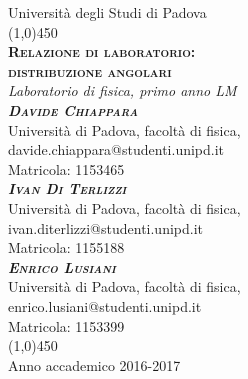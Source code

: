 
\begin{titlepage}

\begin{center}
\LARGE{Università degli Studi di Padova}\\
\line(1,0){450}\\
\vspace{1em}
\Huge{\textsc{\textbf{Relazione di laboratorio:\\ distribuzione angolari}}}\\
\vspace{2em}
\LARGE{\textit{Laboratorio di fisica, primo anno LM}}\\
\vspace{4em}
\huge{\textbf\textsc\textit{{{Davide Chiappara}}}}\\
\vspace{0.5em}
\normalsize{Università di Padova, facoltà di fisica,}\\
\normalsize{davide.chiappara@studenti.unipd.it}\\
\normalsize{Matricola: 1153465}\\
\vspace{1em}
\huge{\textbf\textsc\textit{{{Ivan Di Terlizzi}}}}\\
\vspace{0.5em}
\normalsize{Università di Padova, facoltà di fisica,}\\
\normalsize{ivan.diterlizzi@studenti.unipd.it}\\
\normalsize{Matricola: 1155188}\\
\vspace{1em}
\huge{\textbf\textsc\textit{{{Enrico Lusiani}}}}\\
\vspace{0.5em}
\normalsize{Università di Padova, facoltà di fisica,}\\
\normalsize{enrico.lusiani@studenti.unipd.it}\\
\normalsize{Matricola: 1153399}\\
\vfill
\line(1,0){450}\\
\LARGE{Anno accademico 2016-2017}
\end{center}

\end{titlepage}

